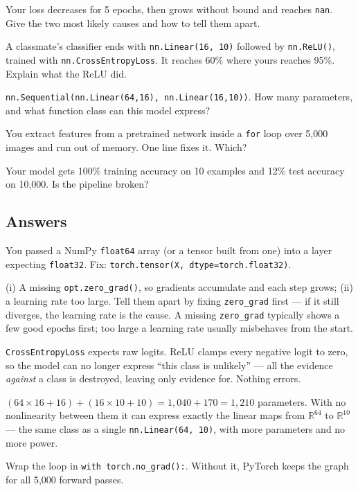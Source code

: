 \documentclass[11pt]{article}
\begin{document}
 Your loss decreases for 5 epochs, then grows without bound and reaches
\texttt{nan}. Give the two most likely causes and how to tell them apart.

 A classmate's classifier ends with
\texttt{nn.Linear(16, 10)} followed by \texttt{nn.ReLU()}, trained with
\texttt{nn.CrossEntropyLoss}. It reaches 60\% where yours reaches 95\%. Explain
what the ReLU did.

 \texttt{nn.Sequential(nn.Linear(64,16), nn.Linear(16,10))}. How many
parameters, and what function class can this model express?

 You extract features from a pretrained network inside a
\texttt{for} loop over 5,000 images and run out of memory. One line fixes it.
Which?

 Your model gets 100\% training accuracy on 10 examples and 12\% test
accuracy on 10,000. Is the pipeline broken?

\subsection*{Answers}

 You passed a NumPy \texttt{float64} array (or a tensor built from one)
into a layer expecting \texttt{float32}. Fix:
\texttt{torch.tensor(X, dtype=torch.float32)}.

 (i) A missing \texttt{opt.zero\_grad()}, so gradients accumulate and
each step grows; (ii) a learning rate too large. Tell them apart by fixing
\texttt{zero\_grad} first --- if it still diverges, the learning rate is the
cause. A missing \texttt{zero\_grad} typically shows a few good epochs first;
too large a learning rate usually misbehaves from the start.

 \texttt{CrossEntropyLoss} expects raw logits. ReLU clamps every
negative logit to zero, so the model can no longer express ``this class is
unlikely'' --- all the evidence \emph{against} a class is destroyed, leaving only
evidence for. Nothing errors.

 $(64{\times}16 + 16) + (16{\times}10 + 10) = 1{,}040 + 170 = 1{,}210$
parameters. With no nonlinearity between them it can express exactly the linear
maps from $\mathbb{R}^{64}$ to $\mathbb{R}^{10}$ --- the same class as a single
\texttt{nn.Linear(64, 10)}, with more parameters and no more power.

 Wrap the loop in \texttt{with torch.no\_grad():}. Without it, PyTorch
keeps the graph for all 5,000 forward passes.
\end{document}
